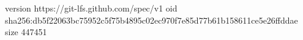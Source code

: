 version https://git-lfs.github.com/spec/v1
oid sha256:db5f22063bc75952c5f75b4895c02ec970f7e85d77b61b158611ce5e26ffddae
size 447451
